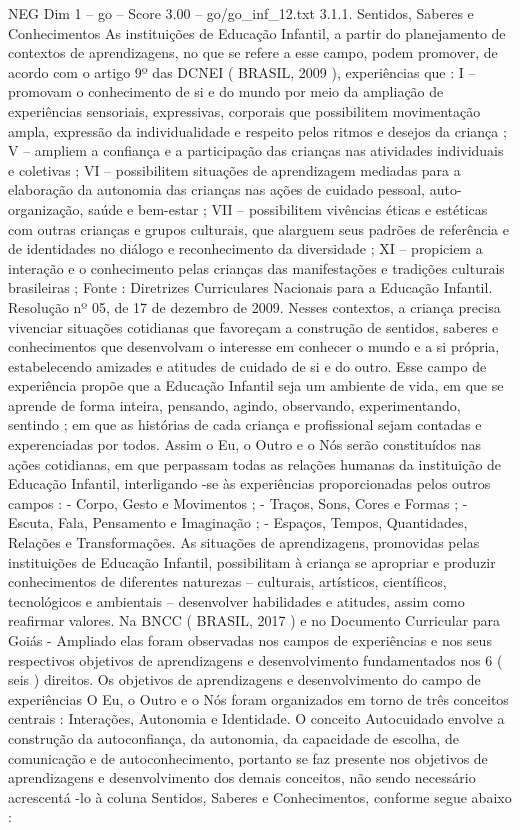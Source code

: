 \begin{textsample}{NEG Dim 1 – go – Score 3.00 – go/go\_inf\_12.txt}  \label{ex:f1_neg_196}
3.1.1.
Sentidos, Saberes e Conhecimentos As instituições de Educação Infantil, a partir do planejamento de contextos de aprendizagens, no que se refere a esse campo, podem promover, de acordo com o artigo 9º das DCNEI ( BRASIL, 2009 ), experiências que : I – promovam o conhecimento de si e do mundo por meio da ampliação de experiências sensoriais, expressivas, corporais que possibilitem movimentação ampla, expressão da individualidade e respeito pelos ritmos e desejos da criança ; V – ampliem a confiança e a participação das crianças nas atividades individuais e coletivas ; VI – possibilitem situações de aprendizagem mediadas para a elaboração da autonomia das crianças nas ações de cuidado pessoal, auto-organização, saúde e bem-estar ; VII – possibilitem vivências éticas e estéticas com outras crianças e grupos culturais, que alarguem seus padrões de referência e de identidades no diálogo e reconhecimento da diversidade ; XI – propiciem a interação e o conhecimento pelas crianças das manifestações e tradições culturais brasileiras ; Fonte : Diretrizes Curriculares Nacionais para a Educação Infantil.
Resolução nº 05, de 17 de dezembro de 2009.
Nesses contextos, a criança precisa vivenciar situações cotidianas que favoreçam a construção de sentidos, saberes e conhecimentos que desenvolvam o interesse em conhecer o mundo e a si própria, estabelecendo amizades e atitudes de cuidado de si e do outro.
Esse campo de experiência propõe que a Educação Infantil seja um ambiente de vida, em que se aprende de forma inteira, pensando, agindo, observando, experimentando, sentindo ; em que as histórias de cada criança e profissional sejam contadas e experenciadas por todos.
Assim o Eu, o Outro e o Nós serão constituídos nas ações cotidianas, em que perpassam todas as relações humanas da instituição de Educação Infantil, interligando -se às experiências proporcionadas pelos outros campos : - Corpo, Gesto e Movimentos ; - Traços, Sons, Cores e Formas ; - Escuta, Fala, Pensamento e Imaginação ; - Espaços, Tempos, Quantidades, Relações e Transformações.
As situações de aprendizagens, promovidas pelas instituições de Educação Infantil, possibilitam à criança se apropriar e produzir conhecimentos de diferentes naturezas – culturais, artísticos, científicos, tecnológicos e ambientais – desenvolver habilidades e atitudes, assim como reafirmar valores.
Na BNCC ( BRASIL, 2017 ) e no Documento Curricular para Goiás - Ampliado elas foram observadas nos campos de experiências e nos seus respectivos objetivos de aprendizagens e desenvolvimento fundamentados nos 6 ( seis ) direitos.
Os objetivos de aprendizagens e desenvolvimento do campo de experiências O Eu, o Outro e o Nós foram organizados em torno de três conceitos centrais : Interações, Autonomia e Identidade.
O conceito Autocuidado envolve a construção da autoconfiança, da autonomia, da capacidade de escolha, de comunicação e de autoconhecimento, portanto se faz presente nos objetivos de aprendizagens e desenvolvimento dos demais conceitos, não sendo necessário acrescentá -lo à coluna Sentidos, Saberes e Conhecimentos, conforme segue abaixo :

\end{textsample}
